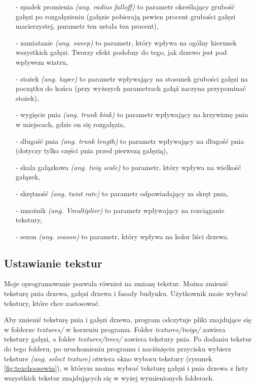 \documentclass[a4paper,twoside,12pt]{report}
\begin{document}
\begin{itemize}
	\item[-] spadek promienia \textit{(ang. radius falloff)} to parametr określający grubość gałęzi po rozgałęzieniu (gałęzie pobierają pewien procent grubości gałęzi macierzystej, parametr ten ustala ten procent),
	\item[-] zamiatanie \textit{(ang. sweep)} to parametr, który wpływa na ogólny kierunek wszystkich gałęzi. Tworzy efekt podobny do tego, jak drzewo jest pod wpływem wiatru,
	\item[-] stożek \textit{(ang. taper)} to parametr wpływający na stosunek grubości gałęzi na początku do końca (przy wyższych parametrach gałąź zaczyna przypominać stożek),
	\item[-] wygięcie pnia \textit{(ang. trunk kink)} to parametr wpływający na krzywiznę pnia w miejscach, gdzie on się rozgałęzia,
	\item[-] długość pnia \textit{(ang. trunk length)} to parametr wpływający na długość pnia (dotyczy tylko części pnia przed pierwszą gałęzią),
	\item[-] skala gałązkowa \textit{(ang. twig scale)} to parametr, który wpływa na wielkość gałązek,
	\item[-] skrętność \textit{(ang. twist rate)} to parametr odpowiadający za skręt pnia,
	\item[-] mnożnik \textit{(ang. Vmultiplier)} to parametr wpływający na rozciąganie tekstury,
	\item[-] sezon \textit{(ang. season)} to parametr, który wpływa na kolor liści drzewa.
\end{itemize}


\subsection{Ustawianie tekstur}

Moje oprogramowanie pozwala również na zmianę tekstur. 
Można zmienić teksturę pnia drzewa, gałęzi drzewa i fasady budynku.
Użytkownik może wybrać tekstury, które chce zastosować. 

Aby zmienić teksturę pnia i gałęzi drzewa, program odczytuje pliki 
znajdujące się w folderze \textit{textures/} w korzeniu programu. 
Folder \textit{textures/twigs/} zawiera tekstury gałęzi, 
a folder \textit{textures/trees/} zawiera tekstury pnia.
Po dodaniu tekstur do tego folderu, po uruchomieniu programu i 
naciśnięciu przycisku wybierz teksture \textit{(ang. select texture)} 
otwiera okno wyboru tekstury (rysunek \ref{fig:texchoosewin}), w którym 
można wybrać teksturę gałęzi i pnia drzewa z listy wszystkich tekstur 
znajdujących się w wyżej wymienionych folderach.
\end{document}
